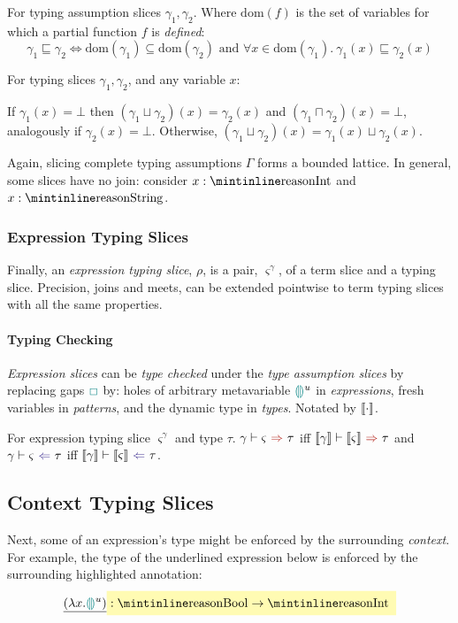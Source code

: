 \begin{definition}
For typing assumption slices $\gamma_1, \gamma_2$. Where $\mathrm{dom}(f)$ is the set of variables for which a partial function $f$ is \textit{defined}:
\[\gamma_1 \sqsubseteq \gamma_2 \iff \mathrm{dom}(\gamma_1) \subseteq \mathrm{dom}(\gamma_2) \text{ and } \forall x \in  \mathrm{dom}(\gamma_1).\ \gamma_1(x) \sqsubseteq \gamma_2(x)\]
\end{definition}
\begin{definition}
For typing slices $\gamma_1, \gamma_2$, and any variable $x$: 

If $\gamma_1(x) = \bot$ then $(\gamma_1 \sqcup \gamma_2)(x) = \gamma_2(x)$ and $(\gamma_1 \sqcap \gamma_2)(x) = \bot$, analogously if $\gamma_2(x) = \bot$. Otherwise, $(\gamma_1 \sqcup \gamma_2)(x) = \gamma_1(x) \sqcup \gamma_2(x)$.
\end{definition}
Again, slicing complete typing assumptions $\Gamma$ forms a bounded lattice. In general, some slices have no join: consider $x : \code{Int}$ and $x : \code{String}$.

\subsubsection{Expression Typing Slices}
Finally, an \textit{expression typing slice}, $\rho$, is a pair, $\varsigma^\gamma$, of a term slice and a typing slice. Precision, joins and meets, can be extended pointwise to term typing slices with all the same properties.

\paragraph{Typing Checking} \textit{Expression slices} can be \textit{type checked} under the \textit{type assumption slices} by replacing gaps ${\color{teal}\Box}$ by: holes of arbitrary metavariable ${\color{teal}\llparenthesis}  {\color{teal}\rrparenthesis}^u$ in \textit{expressions}, fresh variables in \textit{patterns}, and the dynamic type in \textit{types}. Notated by $\llbracket \cdot \rrbracket$.

\begin{definition}
For expression typing slice $\varsigma^{\gamma}$ and type $\tau$. $\synthesis[\gamma]{\varsigma}{\tau}$ iff $\synthesis[\type{\gamma}]{\type{\varsigma}}{\tau}$ and $\analysis[\gamma]{\varsigma}{\tau}$ iff $\analysis[\type{\gamma}]{\type{\varsigma}}{\tau}$.
\end{definition}
\subsection{Context Typing Slices}\label{sec:ContextTypingSlices}
Next, some of an expression's type might be enforced by the surrounding \textit{context}. For example, the  type of the underlined expression below is enforced by the surrounding highlighted annotation:
\[\underline{(\lambda x. \hole^u )} \hlcmaths[yellow!30]{:  \code{Bool} \hlcmaths[yellow!30]{\to \code{Int}}}\]

